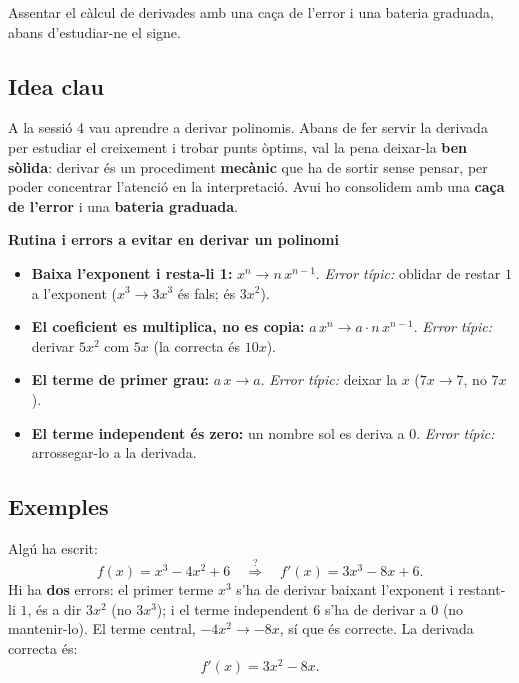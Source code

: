 %
{Assentar el càlcul de derivades amb una caça de l'error i una bateria graduada, abans d'estudiar-ne el signe.}

\subsection{Idea clau}

A la sessió 4 vau aprendre a derivar polinomis. Abans de fer servir la derivada per
estudiar el creixement i trobar punts òptims, val la pena deixar-la \textbf{ben
sòlida}: derivar és un procediment \textbf{mecànic} que ha de sortir sense pensar, per
poder concentrar l'atenció en la interpretació. Avui ho consolidem amb una
\textbf{caça de l'error} i una \textbf{bateria graduada}.

\begin{idea}
\textbf{Rutina i errors a evitar en derivar un polinomi}
\begin{itemize}[leftmargin=1.4em, itemsep=2pt]
  \item \textbf{Baixa l'exponent i resta-li 1:} $x^n\to n\,x^{n-1}$.
        \emph{Error típic:} oblidar de restar $1$ a l'exponent ($x^3\to 3x^3$ és fals;
        és $3x^2$).
  \item \textbf{El coeficient es multiplica, no es copia:} $a\,x^n\to a\cdot n\,x^{n-1}$.
        \emph{Error típic:} derivar $5x^2$ com $5x$ (la correcta és $10x$).
  \item \textbf{El terme de primer grau:} $a\,x\to a$. \emph{Error típic:} deixar la
        $x$ ($7x\to 7$, no $7x$).
  \item \textbf{El terme independent és zero:} un nombre sol es deriva a $0$.
        \emph{Error típic:} arrossegar-lo a la derivada.
\end{itemize}
\end{idea}

\subsection{Exemples}

\begin{exemple}
Algú ha escrit:
\[
f(x)=x^3-4x^2+6 \quad\overset{?}{\Longrightarrow}\quad f'(x)=3x^3-8x+6.
\]
Hi ha \textbf{dos} errors: el primer terme $x^3$ s'ha de derivar baixant l'exponent i
restant-li $1$, és a dir $3x^2$ (no $3x^3$); i el terme independent $6$ s'ha de derivar
a $0$ (no mantenir-lo). El terme central, $-4x^2\to -8x$, sí que és correcte. La
derivada correcta és:
\[
f'(x)=3x^2-8x.
\]
\end{exemple}

